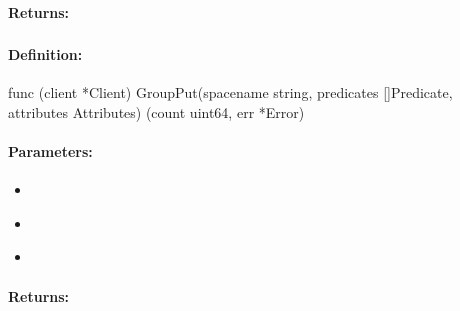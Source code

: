 \paragraph{Returns:}


\pagebreak
\subsubsection{}
\label{api:Go:GroupPut}


\paragraph{Definition:}
\begin{gocode}
func (client *Client) GroupPut(spacename string, predicates []Predicate, attributes Attributes) (count uint64, err *Error)
\end{gocode}

\paragraph{Parameters:}
\begin{itemize}[noitemsep]
\item {}\\

\item {}\\

\item {}\\

\end{itemize}

\paragraph{Returns:}


\pagebreak
\subsubsection{}
\label{api:Go:PutIfNotExist}


